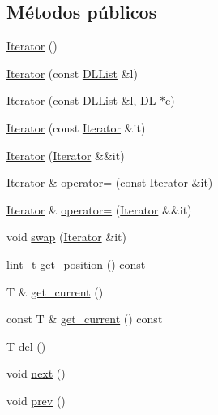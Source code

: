 \subsection*{Métodos públicos}
\begin{DoxyCompactItemize}
\item 
\hyperlink{class_designar_1_1_d_l_list_1_1_iterator_a2d2ee7eeaa63b3b2e051a76fb4c4e164}{Iterator} ()
\item 
\hyperlink{class_designar_1_1_d_l_list_1_1_iterator_a7e1757caeeef81f003526fda985664cb}{Iterator} (const \hyperlink{class_designar_1_1_d_l_list}{D\+L\+List} \&l)
\item 
\hyperlink{class_designar_1_1_d_l_list_1_1_iterator_a41bf428b6219be3f152460de103f4413}{Iterator} (const \hyperlink{class_designar_1_1_d_l_list}{D\+L\+List} \&l, \hyperlink{class_designar_1_1_d_l}{DL} $\ast$c)
\item 
\hyperlink{class_designar_1_1_d_l_list_1_1_iterator_a824a391fc47274867bffac143a3d740b}{Iterator} (const \hyperlink{class_designar_1_1_d_l_list_1_1_iterator}{Iterator} \&it)
\item 
\hyperlink{class_designar_1_1_d_l_list_1_1_iterator_ad6d70cfea31c61502831f20b87d4f56f}{Iterator} (\hyperlink{class_designar_1_1_d_l_list_1_1_iterator}{Iterator} \&\&it)
\item 
\hyperlink{class_designar_1_1_d_l_list_1_1_iterator}{Iterator} \& \hyperlink{class_designar_1_1_d_l_list_1_1_iterator_a292588690dcaa7acc2311a92e535424e}{operator=} (const \hyperlink{class_designar_1_1_d_l_list_1_1_iterator}{Iterator} \&it)
\item 
\hyperlink{class_designar_1_1_d_l_list_1_1_iterator}{Iterator} \& \hyperlink{class_designar_1_1_d_l_list_1_1_iterator_a92bdff852753fecd794b5691419858a8}{operator=} (\hyperlink{class_designar_1_1_d_l_list_1_1_iterator}{Iterator} \&\&it)
\item 
void \hyperlink{class_designar_1_1_d_l_list_1_1_iterator_afb6abdec64f67b81813441a4c7d133d1}{swap} (\hyperlink{class_designar_1_1_d_l_list_1_1_iterator}{Iterator} \&it)
\item 
\hyperlink{namespace_designar_a9d113d66a39e82b73727c72cd3a52f73}{lint\+\_\+t} \hyperlink{class_designar_1_1_d_l_list_1_1_iterator_acf69183ba9dedd6fdb7dee8854cfce17}{get\+\_\+position} () const
\item 
T \& \hyperlink{class_designar_1_1_d_l_list_1_1_iterator_ad724b6e244dcd79d58b5772083e853ef}{get\+\_\+current} ()
\item 
const T \& \hyperlink{class_designar_1_1_d_l_list_1_1_iterator_a337833cfd046d1b1e69e9af95bdc3280}{get\+\_\+current} () const
\item 
T \hyperlink{class_designar_1_1_d_l_list_1_1_iterator_a98644b925b49ea22a9552039abb2624d}{del} ()
\item 
void \hyperlink{class_designar_1_1_d_l_list_1_1_iterator_ac4eb0645c0e4e68057bf0bc05cf3c8c3}{next} ()
\item 
void \hyperlink{class_designar_1_1_d_l_list_1_1_iterator_ac713eeea83e3e32a939067614a13c41d}{prev} ()
\end{DoxyCompactItemize}
